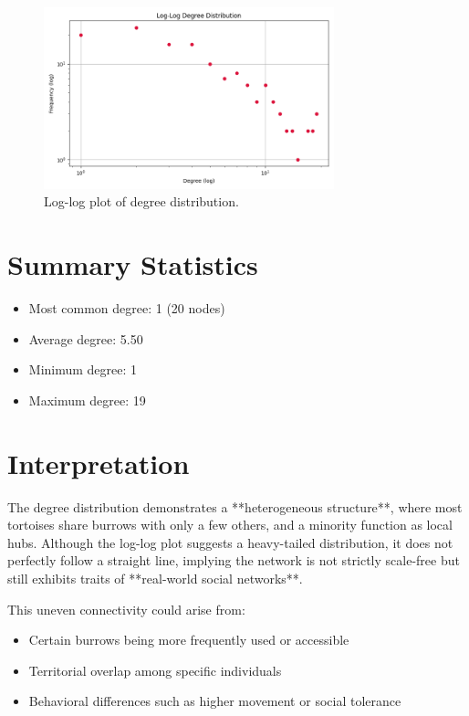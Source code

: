 \documentclass[12pt]{report}
\begin{document}
\begin{figure}[h!]
    \centering
    \includegraphics[width=0.75\textwidth]{Images/Log-Log Degree Distribution.png}
    \caption{Log-log plot of degree distribution.}
    \label{fig:loglog-degree}
\end{figure}

\section*{Summary Statistics}

\begin{itemize}
    \item Most common degree: 1 (20 nodes)
    \item Average degree: 5.50
    \item Minimum degree: 1
    \item Maximum degree: 19
\end{itemize}

\section*{Interpretation}

The degree distribution demonstrates a **heterogeneous structure**, where most tortoises share burrows with only a few others, and a minority function as local hubs. Although the log-log plot suggests a heavy-tailed distribution, it does not perfectly follow a straight line, implying the network is not strictly scale-free but still exhibits traits of **real-world social networks**.

This uneven connectivity could arise from:
\begin{itemize}
    \item Certain burrows being more frequently used or accessible
    \item Territorial overlap among specific individuals
    \item Behavioral differences such as higher movement or social tolerance
\end{itemize}
\end{document}
